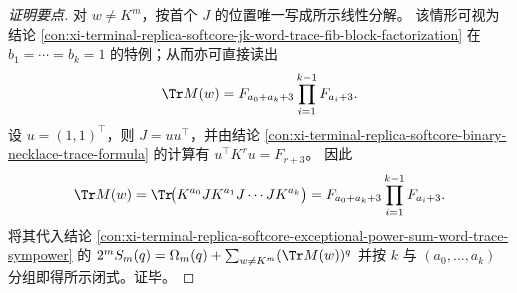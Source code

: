 \begin{proof}[证明要点]
对 \(w\neq K^m\)，按首个 \(J\) 的位置唯一写成所示线性分解。
该情形可视为结论 \ref{con:xi-terminal-replica-softcore-jk-word-trace-fib-block-factorization} 在 \(b_1=\cdots=b_k=1\) 的特例；从而亦可直接读出
\[
\Tr M(w)=F_{a_0+a_k+3}\prod_{i=1}^{k-1}F_{a_i+3}.
\]
设 \(u=(1,1)^{\top}\)，则 \(J=uu^{\top}\)，并由结论 \ref{con:xi-terminal-replica-softcore-binary-necklace-trace-formula} 的计算有
\(u^{\top}K^{r}u=F_{r+3}\)。
因此
\[
\Tr M(w)=\Tr\!\bigl(K^{a_0}J K^{a_1}J\cdots J K^{a_k}\bigr)
=F_{a_0+a_k+3}\prod_{i=1}^{k-1}F_{a_i+3}.
\]
将其代入结论 \ref{con:xi-terminal-replica-softcore-exceptional-power-sum-word-trace-sympower} 的
\(
2^mS_m(q)=\Omega_m(q)+\sum_{w\neq K^m}(\Tr M(w))^q
\)
并按 \(k\) 与 \((a_0,\dots,a_k)\) 分组即得所示闭式。证毕。
\end{proof}

